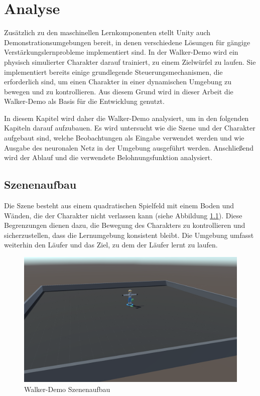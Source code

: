\chapter{Analyse}
\label{sec:analyse}
Zusätzlich zu den maschinellen Lernkomponenten stellt Unity auch Demonstrationsumgebungen bereit, in denen verschiedene Lösungen für gängige Verstärkungslernprobleme implementiert sind. In der Walker-Demo wird ein physisch simulierter Charakter darauf trainiert, zu einem Zielwürfel zu laufen. Sie implementiert bereits einige grundlegende Steuerungsmechanismen, die erforderlich sind, um einen Charakter in einer dynamischen Umgebung zu bewegen und zu kontrollieren. Aus diesem Grund wird in dieser Arbeit die Walker-Demo als Basis für die Entwicklung genutzt. 

In diesem Kapitel wird daher die Walker-Demo analysiert, um in den folgenden Kapiteln darauf aufzubauen. Es wird untersucht wie die Szene und der Charakter aufgebaut sind, welche Beobachtungen als Eingabe verwendet werden und wie Ausgabe des neuronalen Netz in der Umgebung ausgeführt werden. Anschließend wird der Ablauf und die verwendete Belohnungsfunktion analysiert.

\section{Szenenaufbau}
Die Szene besteht aus einem quadratischen Spielfeld mit einem Boden und Wänden, die der Charakter nicht verlassen kann (siehe Abbildung \ref{fig:walker_aufbau}). Diese Begrenzungen dienen dazu, die Bewegung des Charakters zu kontrollieren und sicherzustellen, dass die Lernumgebung konsistent bleibt. Die Umgebung umfasst weiterhin den Läufer und das Ziel, zu dem der Läufer lernt zu laufen.

\begin{figure}[H]
  \centering  
  \includegraphics[scale=0.35]{img/walker_aufbau.png}
  \caption{Walker-Demo Szenenaufbau}
  \label{fig:walker_aufbau}
\end{figure}

